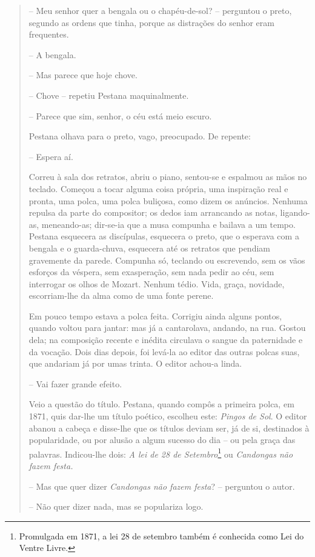 \begin{quote}
-- Meu senhor quer a bengala ou o chapéu-de-sol? -- perguntou o preto,
segundo as ordens que tinha, porque as distrações do senhor eram
frequentes.

-- A bengala.

-- Mas parece que hoje chove.

-- Chove -- repetiu Pestana maquinalmente.

-- Parece que sim, senhor, o céu está meio escuro.

Pestana olhava para o preto, vago, preocupado. De repente:

-- Espera aí.

Correu à sala dos retratos, abriu o piano, sentou-se e espalmou as mãos
no teclado. Começou a tocar alguma coisa própria, uma inspiração real e
pronta, uma polca, uma polca buliçosa, como dizem os anúncios. Nenhuma
repulsa da parte do compositor; os dedos iam arrancando as notas,
ligando-as, meneando-as; dir-se-ia que a musa compunha e bailava a um
tempo. Pestana esquecera as discípulas, esquecera o preto, que o
esperava com a bengala e o guarda-chuva, esquecera até os retratos que
pendiam gravemente da parede. Compunha só, teclando ou escrevendo, sem
os vãos esforços da véspera, sem exasperação, sem nada pedir ao céu, sem
interrogar os olhos de Mozart. Nenhum tédio. Vida, graça, novidade,
escorriam-lhe da alma como de uma fonte perene.

Em pouco tempo estava a polca feita. Corrigiu ainda alguns pontos,
quando voltou para jantar: mas já a cantarolava, andando, na rua. Gostou
dela; na composição recente e inédita circulava o sangue da paternidade
e da vocação. Dois dias depois, foi levá-la ao editor das outras polcas
suas, que andariam já por umas trinta. O editor achou-a linda.

-- Vai fazer grande efeito.

Veio a questão do título. Pestana, quando compôs a primeira polca, em
1871, quis dar-lhe um título poético, escolheu este: \emph{Pingos de
Sol}. O editor abanou a cabeça e disse-lhe que os títulos deviam ser, já
de si, destinados à popularidade, ou por alusão a algum sucesso do dia
-- ou pela graça das palavras. Indicou-lhe dois: \emph{A lei de 28 de
Setembro}\footnote{Promulgada em 1871, a lei 28 de setembro também é
  conhecida como Lei do Ventre Livre.} ou \emph{Candongas não}
\emph{fazem festa.}

-- Mas que quer dizer \emph{Candongas não fazem festa}? -- perguntou o
autor.

-- Não quer dizer nada, mas se populariza logo.


\end{quote}
